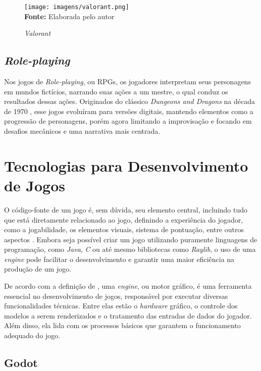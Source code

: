 \FloatBarrier 
\begin{figure}[!htbp]
	\centering
	\caption{\textit{Valorant}}
	\texttt{[image: imagens/valorant.png]}
	\\\textbf{Fonte:} Elaborada pelo autor
	\label{fig:vava}
\end{figure}
\FloatBarrier


\subsection{\textit{Role-playing}}

Nos jogos de \textit{Role-playing}, ou RPGs, os jogadores interpretam seus personagens em mundos fictícios, narrando suas ações a um mestre, o qual conduz os resultados dessas ações. Originados do clássico  \textit{Dungeons and Dragons} na década de 1970 \cite{Mason2004}, esse jogos evoluíram para versões digitais, mantendo elementos como a progressão de personagens, porém agora limitando a improvisação e focando em desafios mecânicos e uma narrativa mais centrada.

\section{Tecnologias para Desenvolvimento de Jogos} 

O código-fonte de um jogo é, sem dúvida, seu elemento central, incluindo tudo que está diretamente relacionado ao jogo, definindo a experiência do jogador, como a jogabilidade, os elementos visuais, sistema de pontuação, entre outros aspectos \cite{Rabin2021}. Embora seja possível criar um jogo utilizando puramente linguagens de programação, como \textit{Java}, \textit{C} ou até mesmo bibliotecas como \textit{Raylib}, o uso de uma \textit{engine} pode facilitar o desenvolvimento e garantir uma maior eficiência na produção de um jogo.

De acordo com a definição de , uma \textit{engine}, ou motor gráfico, é uma ferramenta essencial no desenvolvimento de jogos, responsável por executar diversas funcionalidades técnicas. Entre elas estão o \textit{hardware} gráfico, o controle dos modelos a serem renderizados e o tratamento das entradas de dados do jogador. Além disso, ela lida com os processos básicos que garantem o funcionamento adequado do jogo. 

\subsection{Godot}

